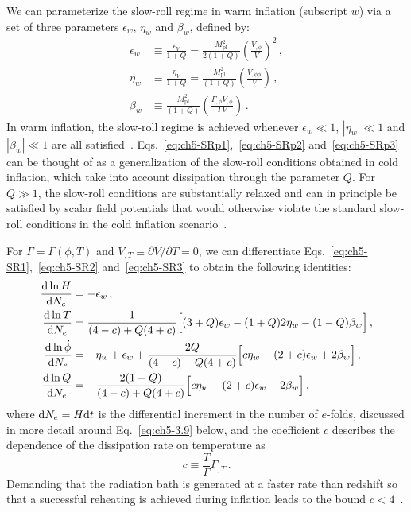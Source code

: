 We can parameterize the slow-roll regime in warm inflation (subscript ${w}$) via a set of three parameters $\epsilon_{w}$, $\eta_{w}$ and $\beta_{w}$, defined by:
\begin{align}
\epsilon_{w} & \equiv \frac{\epsilon_{V}}{1+Q}=\frac{M_{\mathrm{pl}}^{2}}{2(1+Q)}\left(\frac{V_{, \phi}}{V}\right)^{2}\,, \label{eq:ch5-SRp1} \\
\eta_{w} & \equiv \frac{\eta_{V}}{1+Q}=\frac{M_{\mathrm{pl}}^{2}}{(1+Q)}\left(\frac{V_{, \phi \phi}}{V}\right)\,, \label{eq:ch5-SRp2} \\
\beta_{w} & \equiv \frac{M_{\mathrm{pl}}^{2}}{(1+Q)}\left(\frac{\Gamma_{, \phi} V_{, \phi}}{\Gamma V}\right) \label{eq:ch5-SRp3}\,.
\end{align}
In warm inflation, the slow-roll regime is achieved whenever $\epsilon_w \ll 1$, $|\eta_w| \ll 1$ and $|\beta_w| \ll 1$ are all satisfied~\cite{Taylor:2000ze, Hall:2003zp, Bastero-Gil:2004oun, Moss:2008yb}. Eqs.~\ref{eq:ch5-SRp1},~\ref{eq:ch5-SRp2} and~\ref{eq:ch5-SRp3} can be thought of as a generalization of the slow-roll conditions obtained in cold inflation, which take into account dissipation through the parameter $Q$. For $Q\gg 1$, the slow-roll conditions are substantially relaxed and can in principle be satisfied by scalar field potentials that would otherwise violate the standard slow-roll conditions in the cold inflation scenario~\cite{Motaharfar:2018zyb,Das:2020xmh,Kamali:2021ugx,Santos:2022exm}.

For $\Gamma=\Gamma(\phi, T)$ and $V_{,T} \equiv \partial V/\partial T =0$, we can differentiate Eqs.~\ref{eq:ch5-SR1},~\ref{eq:ch5-SR2} and~\ref{eq:ch5-SR3} to obtain the following identities:
\begin{align}
    \frac{{\rm d}\ln H}{{\rm d}N_e}&=-\epsilon_w\,, \label{eq:ch5-d1} \\
    \frac{{\rm d}\ln T}{{\rm d}N_e}&=\frac{1}{(4-c)+Q(4+c)}\Big[(3+Q)\epsilon_w-(1+Q)2\eta_w- (1-Q)\beta_w\Big]\,, \label{eq:ch5-d2} \\
    \frac{{\rm d}\ln \Dot{\phi}}{{\rm d}N_e}&=-\eta_w+\epsilon_w+\frac{2Q}{(4-c)+Q(4+c)}\Big[c\eta_w- (2+c)\epsilon_w+ 2\beta_w\Big]\,, \label{eq:ch5-d3} \\
    \frac{{\rm d}\ln Q}{{\rm d}N_e}&= -\frac{2(1+Q)}{(4-c)+Q(4+c)}\Big[c\eta_w- (2+c)\epsilon_w + 2\beta_w\Big]\,, \label{eq:ch5-d4}
\end{align}
where ${\rm d}N_e=H{\rm d}t$ is the differential increment in the number of $e$-folds, discussed in more detail around Eq.~\ref{eq:ch5-3.9} below, and the coefficient $c$ describes the dependence of the dissipation rate on temperature as
\begin{equation}
    \label{eq:ch5-def-c}
    c \equiv \frac{T}{\Gamma}\Gamma_{,T}\,.
\end{equation}
Demanding that the radiation bath is generated at a faster rate than redshift so that a successful reheating is achieved during inflation leads to the bound $c < 4$~\cite{Bastero-Gil:2011rva}.

